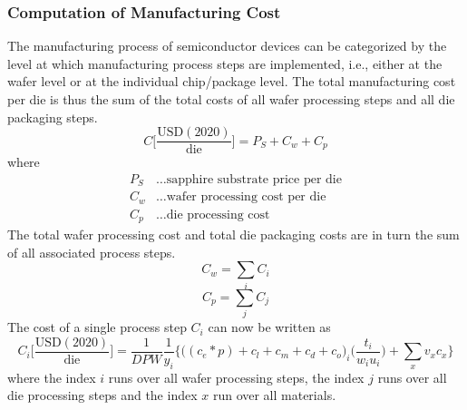 \documentclass[parskip=full]{article}
\begin{document}
\subsubsection{Computation of Manufacturing Cost}
\label{subsec:cost_computation}

The manufacturing process of semiconductor devices can be categorized by the level at which manufacturing process steps are implemented, i.e., either at the wafer level or at the individual chip/package level. The total manufacturing cost per die is thus the sum of the total costs of all wafer processing steps and all die packaging steps.
%
\begin{equation}
\label{eqn:cost_sum}
    C \bigg[ \frac{ \text{USD}(2020) }{ \text{die} } \bigg] = P_S + C_w + C_p
\end{equation}
%
where
%
\begin{align*}
    P_S &\dots \text{sapphire substrate price per die} \\
    C_w &\dots \text{wafer processing cost per die} \\
    C_p &\dots \text{die processing cost}
\end{align*}
%
The total wafer processing cost and total die packaging costs are in turn the sum of all associated process steps.
%
\begin{equation}
        C_w = \sum_i C_i
\end{equation}
%
\begin{equation}
	C_p = \sum_j C_j
\end{equation}
%
The cost of a single process step $C_i$ can now be written as
%
\begin{equation}
\label{eqn:cost_wafer}
    C_i \bigg[ \frac{ \text{USD}(2020) }{ \text{die} } \bigg] =\frac{1}{DPW}  \frac{1}{y_i}   \bigg\{ \bigg((c_e*p) + c_l + c_m + c_d + c_o \bigg)_i \bigg( \frac{t_i}{w_i u_i} \bigg) + \sum_{x} v_x c_x \bigg\}
\end{equation}
%
where the index $i$ runs over all wafer processing steps, the index $j$ runs over all die processing steps and the index $x$ run over all materials.
%
\end{document}
